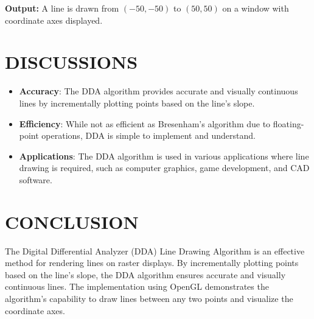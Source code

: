 \documentclass{article}
\begin{document}
\textbf{Output:}
A line is drawn from $(-50, -50)$ to $(50, 50)$ on a window with coordinate axes displayed.

\section*{DISCUSSIONS}
\begin{itemize}
    \item \textbf{Accuracy}: The DDA algorithm provides accurate and visually continuous lines by incrementally plotting points based on the line's slope.
    \item \textbf{Efficiency}: While not as efficient as Bresenham's algorithm due to floating-point operations, DDA is simple to implement and understand.
    \item \textbf{Applications}: The DDA algorithm is used in various applications where line drawing is required, such as computer graphics, game development, and CAD software.
\end{itemize}

\section*{CONCLUSION}
The Digital Differential Analyzer (DDA) Line Drawing Algorithm is an effective method for rendering lines on raster displays. By incrementally plotting points based on the line's slope, the DDA algorithm ensures accurate and visually continuous lines. The implementation using OpenGL demonstrates the algorithm's capability to draw lines between any two points and visualize the coordinate axes.
\end{document}
